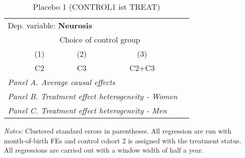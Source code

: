  \begin{table}[H] \centering \begin{threeparttable} \caption{Placebo 1 (CONTROL1 ist TREAT) } {\def\sym#1{\ifmmode^{#1}\else\(^{#1}\)\fi} \begin{tabular}{l*{4}{c}} \toprule \multicolumn{4}{l}{Dep. variable: \textbf{Neurosis}} \\ & \multicolumn{3}{c}{Choice of control group} \\ \cmidrule(lr){2-4}
            &\multicolumn{1}{c}{(1)}&\multicolumn{1}{c}{(2)}&\multicolumn{1}{c}{(3)}\\
            &\multicolumn{1}{c}{C2}&\multicolumn{1}{c}{C3}&\multicolumn{1}{c}{C2+C3}\\
\midrule
 \multicolumn{4}{l}{\emph{Panel A. Average causal effects}} \\      \midrule\multicolumn{4}{l}{\emph{Panel B. Treatment effect heterogeneity - Women}} \\      \midrule\multicolumn{4}{l}{\emph{Panel C. Treatment effect heterogeneity - Men}} \\      
\bottomrule \end{tabular} } \begin{tablenotes} \item \scriptsize \emph{Notes:} Clustered standard errors in parentheses. All regression are run with month-of-birth FEs and control cohort 2 is assigned with the treatment status. All regressions are carried out with a window width of half a year. \end{tablenotes} \end{threeparttable} \end{table} 
